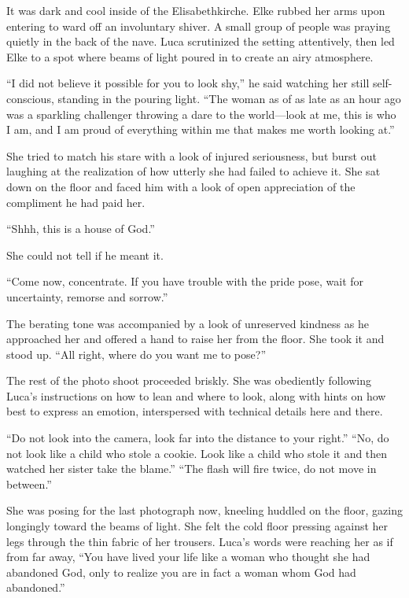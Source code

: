 \sectionline

It was dark and cool inside of the Elisabethkirche. Elke rubbed her arms upon entering to ward off an involuntary shiver. A small group of people was praying quietly in the back of the nave. Luca scrutinized the setting attentively, then led Elke to a spot where beams of light poured in to create an airy atmosphere.

``I did not believe it possible for you to look shy,'' he said watching her still self-conscious, standing in the pouring light. ``The woman as of as late as an hour ago was a sparkling challenger throwing a dare to the world---look at me, this is who I am, and I am proud of everything within me that makes me worth looking at.''

She tried to match his stare with a look of injured seriousness, but burst out laughing at the realization of how utterly she had failed to achieve it. She sat down on the floor and faced him with a look of open appreciation of the compliment he had paid her.

``Shhh, this is a house of God.''

She could not tell if he meant it.

``Come now, concentrate. If you have trouble with the pride pose, wait for uncertainty, remorse and sorrow.''

The berating tone was accompanied by a look of unreserved kindness as he approached her and offered a hand to raise her from the floor. She took it and stood up. ``All right, where do you want me to pose?''

The rest of the photo shoot proceeded briskly. She was obediently following Luca's instructions on how to lean and where to look, along with hints on how best to express an emotion, interspersed with technical details here and there.

``Do not look into the camera, look far into the distance to your right.'' ``No, do not look like a child who stole a cookie. Look like a child who stole it and then watched her sister take the blame.'' ``The flash will fire twice, do not move in between.''

She was posing for the last photograph now, kneeling huddled on the floor, gazing longingly toward the beams of light. She felt the cold floor pressing against her legs through the thin fabric of her trousers. Luca's words were reaching her as if from far away, ``You have lived your life like a woman who thought she had abandoned God, only to realize you are in fact a woman whom God had abandoned.''

